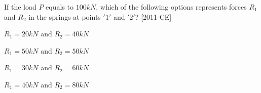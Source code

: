 \iffalse
    \title{Assignment}
    \author{EE24BTECH11066}
    \section{ce}
    \chapter{2011}
  \fi
\item If the load $P$ equals to $100kN$, which of the following options represents forces $R_1$ and $R_2$ in the springs at points $'1'$ and $'2'$? \hfill{[2011-CE]}
\begin{enumerate}
\begin{multicols}{2}
\item $R_1=20kN$ and $R_2=40kN$
\item $R_1=50kN$ and $R_2=50kN$
\item $R_1=30kN$ and $R_2=60kN$
\item $R_1=40kN$ and $R_2=80kN$
\end{multicols}
\end{enumerate}

